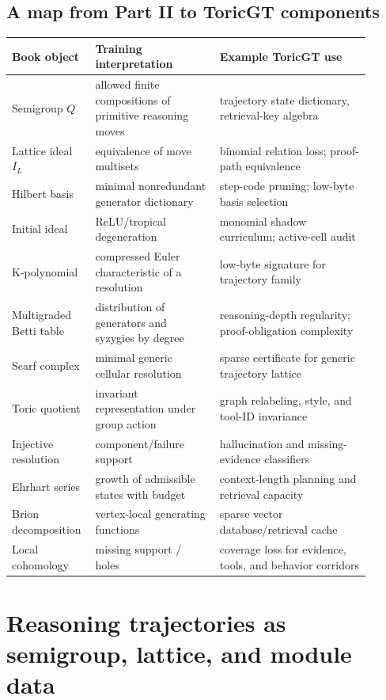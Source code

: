 \documentclass[11pt]{article}
\theoremstyle{definition}
\begin{document}
\subsection{A map from Part II to ToricGT components}
\begin{longtable}{p{0.17\linewidth}p{0.33\linewidth}p{0.40\linewidth}}
\toprule
Book object & Training interpretation & Example ToricGT use \\
\midrule
Semigroup \(Q\) & allowed finite compositions of primitive reasoning moves & trajectory state dictionary, retrieval-key algebra \\
Lattice ideal \(I_L\) & equivalence of move multisets & binomial relation loss; proof-path equivalence \\
Hilbert basis & minimal nonredundant generator dictionary & step-code pruning; low-byte basis selection \\
Initial ideal & ReLU/tropical degeneration & monomial shadow curriculum; active-cell audit \\
K-polynomial & compressed Euler characteristic of a resolution & low-byte signature for trajectory family \\
Multigraded Betti table & distribution of generators and syzygies by degree & reasoning-depth regularity; proof-obligation complexity \\
Scarf complex & minimal generic cellular resolution & sparse certificate for generic trajectory lattice \\
Toric quotient & invariant representation under group action & graph relabeling, style, and tool-ID invariance \\
Injective resolution & component/failure support & hallucination and missing-evidence classifiers \\
Ehrhart series & growth of admissible states with budget & context-length planning and retrieval capacity \\
Brion decomposition & vertex-local generating functions & sparse vector database/retrieval cache \\
Local cohomology & missing support / holes & coverage loss for evidence, tools, and behavior corridors \\
\bottomrule
\end{longtable}

\section{Reasoning trajectories as semigroup, lattice, and module data}
\end{document}
